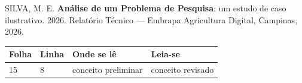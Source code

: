 %
%
%

SILVA, M. E. \textbf{Análise de um Problema de Pesquisa}: um estudo de caso ilustrativo. 2026. Relatório Técnico --- Embrapa Agricultura Digital, Campinas, 2026.

\begin{table}[htb]
	\centering
	\footnotesize
	\begin{tabular}{|p{1.4cm}|p{1cm}|p{3cm}|p{3cm}|}
		\hline
		\textbf{Folha} & \textbf{Linha}  & \textbf{Onde se lê}  & \textbf{Leia-se}  \\
		\hline
		15 & 8 & conceito preliminar & conceito revisado \\
		\hline
	\end{tabular}
\end{table}
